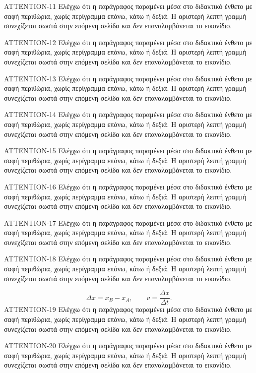 \begin{AttentionBox}
ATTENTION-11 Ελέγχω ότι η παράγραφος παραμένει μέσα στο διδακτικό ένθετο με σαφή περιθώρια, χωρίς περίγραμμα επάνω, κάτω ή δεξιά. Η αριστερή λεπτή γραμμή συνεχίζεται σωστά στην επόμενη σελίδα και δεν επαναλαμβάνεται το εικονίδιο.\par
ATTENTION-12 Ελέγχω ότι η παράγραφος παραμένει μέσα στο διδακτικό ένθετο με σαφή περιθώρια, χωρίς περίγραμμα επάνω, κάτω ή δεξιά. Η αριστερή λεπτή γραμμή συνεχίζεται σωστά στην επόμενη σελίδα και δεν επαναλαμβάνεται το εικονίδιο.\par
ATTENTION-13 Ελέγχω ότι η παράγραφος παραμένει μέσα στο διδακτικό ένθετο με σαφή περιθώρια, χωρίς περίγραμμα επάνω, κάτω ή δεξιά. Η αριστερή λεπτή γραμμή συνεχίζεται σωστά στην επόμενη σελίδα και δεν επαναλαμβάνεται το εικονίδιο.\par
ATTENTION-14 Ελέγχω ότι η παράγραφος παραμένει μέσα στο διδακτικό ένθετο με σαφή περιθώρια, χωρίς περίγραμμα επάνω, κάτω ή δεξιά. Η αριστερή λεπτή γραμμή συνεχίζεται σωστά στην επόμενη σελίδα και δεν επαναλαμβάνεται το εικονίδιο.\par
ATTENTION-15 Ελέγχω ότι η παράγραφος παραμένει μέσα στο διδακτικό ένθετο με σαφή περιθώρια, χωρίς περίγραμμα επάνω, κάτω ή δεξιά. Η αριστερή λεπτή γραμμή συνεχίζεται σωστά στην επόμενη σελίδα και δεν επαναλαμβάνεται το εικονίδιο.\par
ATTENTION-16 Ελέγχω ότι η παράγραφος παραμένει μέσα στο διδακτικό ένθετο με σαφή περιθώρια, χωρίς περίγραμμα επάνω, κάτω ή δεξιά. Η αριστερή λεπτή γραμμή συνεχίζεται σωστά στην επόμενη σελίδα και δεν επαναλαμβάνεται το εικονίδιο.\par
ATTENTION-17 Ελέγχω ότι η παράγραφος παραμένει μέσα στο διδακτικό ένθετο με σαφή περιθώρια, χωρίς περίγραμμα επάνω, κάτω ή δεξιά. Η αριστερή λεπτή γραμμή συνεχίζεται σωστά στην επόμενη σελίδα και δεν επαναλαμβάνεται το εικονίδιο.\par
ATTENTION-18 Ελέγχω ότι η παράγραφος παραμένει μέσα στο διδακτικό ένθετο με σαφή περιθώρια, χωρίς περίγραμμα επάνω, κάτω ή δεξιά. Η αριστερή λεπτή γραμμή συνεχίζεται σωστά στην επόμενη σελίδα και δεν επαναλαμβάνεται το εικονίδιο.\par
\[\Delta x=x_B-x_A,\qquad v=\frac{\Delta x}{\Delta t}.\]
ATTENTION-19 Ελέγχω ότι η παράγραφος παραμένει μέσα στο διδακτικό ένθετο με σαφή περιθώρια, χωρίς περίγραμμα επάνω, κάτω ή δεξιά. Η αριστερή λεπτή γραμμή συνεχίζεται σωστά στην επόμενη σελίδα και δεν επαναλαμβάνεται το εικονίδιο.\par
ATTENTION-20 Ελέγχω ότι η παράγραφος παραμένει μέσα στο διδακτικό ένθετο με σαφή περιθώρια, χωρίς περίγραμμα επάνω, κάτω ή δεξιά. Η αριστερή λεπτή γραμμή συνεχίζεται σωστά στην επόμενη σελίδα και δεν επαναλαμβάνεται το εικονίδιο.\par

\end{AttentionBox}
